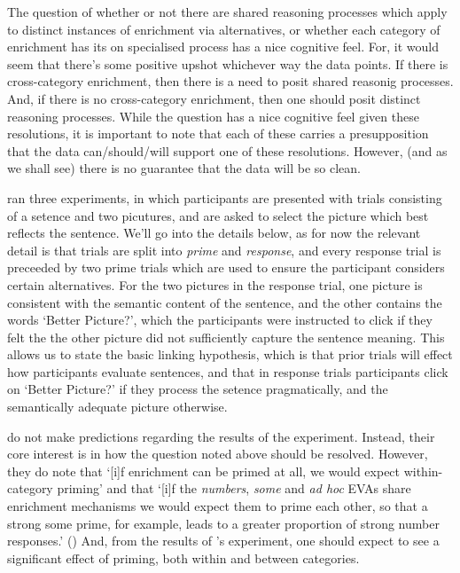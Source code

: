 \documentclass[10pt]{article}
\begin{document}
\begin{multicols}{2}
The question of whether or not there are shared reasoning processes which apply to distinct instances of enrichment via alternatives, or whether each category of enrichment has its on specialised process has a nice cognitive feel.
For, it would seem that there's some positive upshot whichever way the data points.
If there is cross-category enrichment, then there is a need to posit shared reasonig processes.
And, if there is no cross-category enrichment, then one should posit distinct reasoning processes.
While the question has a nice cognitive feel given these resolutions, it is important to note that each of these carries a presupposition that the data can/should/will support one of these resolutions.
However, (and as we shall see) there is no guarantee that the data will be so clean.

\citeauthor{Bott:2016aa} ran three experiments, in which participants are presented with trials consisting of a setence and two picutures, and are asked to select the picture which best reflects the sentence.
We'll go into the details below, as for now the relevant detail is that trials are split into \emph{prime} and \emph{response}, and every response trial is preceeded by two prime trials which are used to ensure the participant considers certain alternatives.
For the two pictures in the response trial, one picture is consistent with the semantic content of the sentence, and the other contains the words `Better Picture?', which the participants were instructed to click if they felt the the other picture did not sufficiently capture the sentence meaning.
This allows us to state the basic linking hypothesis, which is that prior trials will effect how participants evaluate sentences, and that in response trials participants click on `Better Picture?' if they process the setence pragmatically, and the semantically adequate picture otherwise.

\citeauthor{Bott:2016aa} do not make predictions regarding the results of the experiment.
Instead, their core interest is in how the question noted above should be resolved.
However, they do note that `[i]f enrichment can be primed at all, we would expect within-category priming' and that `[i]f the \emph{numbers}, \emph{some} and \emph{ad hoc} EVAs share enrichment mechanisms we would expect them to prime each other, so that a strong some prime, for example, leads to a greater proportion of strong number responses.'
(\citeyear[122]{Bott:2016aa})
And, from the results of \citeauthor{Bott:2016aa}'s experiment, one should expect to see a significant effect of priming, both within and between categories.


\end{multicols}
\end{document}
